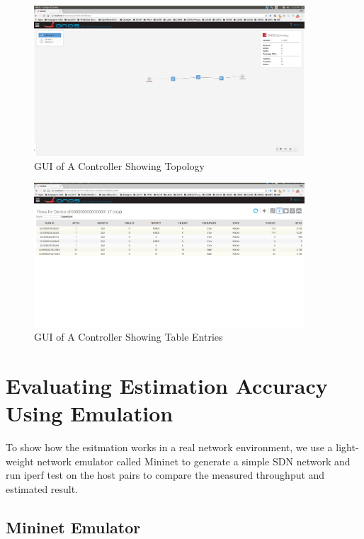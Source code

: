 \documentclass[12pt]{article}
\begin{document}
\begin{figure}
  \centering
  \includegraphics[width=0.9\textwidth]{onos.png}
  \caption{GUI of A Controller Showing Topology}
  \label{fig:onos}
\end{figure}

\begin{figure}
  \centering
  \includegraphics[width=0.9\textwidth]{stats.png}
  \caption{GUI of A Controller Showing Table Entries}
  \label{fig:stats}
\end{figure}


\section{Evaluating Estimation Accuracy Using Emulation}

To show how the esitmation works in a real network environment, we use a light-weight network emulator called Mininet \cite{mininet} to generate a simple SDN network and run iperf test on the host pairs to compare the measured throughput and estimated result.

\subsection{Mininet Emulator}
\end{document}
